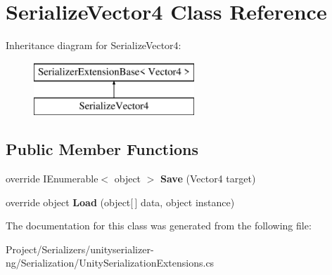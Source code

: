 \hypertarget{class_serialize_vector4}{}\section{Serialize\+Vector4 Class Reference}
\label{class_serialize_vector4}
Inheritance diagram for Serialize\+Vector4\+:\begin{figure}[H]
\begin{center}
\leavevmode
\includegraphics[height=2.000000cm]{class_serialize_vector4}
\end{center}
\end{figure}
\subsection*{Public Member Functions}
\begin{DoxyCompactItemize}
\item 
\mbox{\label{class_serialize_vector4_a89b8effbb37fc428b4cc27a646eafe55}} 
override I\+Enumerable$<$ object $>$ {\bfseries Save} (Vector4 target)
\item 
\mbox{\label{class_serialize_vector4_a27f598468775a1c9f882b7ab378274cd}} 
override object {\bfseries Load} (object\mbox{[}$\,$\mbox{]} data, object instance)
\end{DoxyCompactItemize}


The documentation for this class was generated from the following file\+:\begin{DoxyCompactItemize}
\item 
Project/\+Serializers/unityserializer-\/ng/\+Serialization/Unity\+Serialization\+Extensions.\+cs\end{DoxyCompactItemize}
